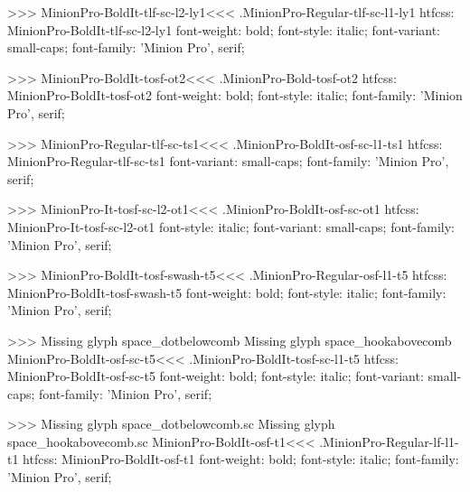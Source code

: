 {>>>
\<MinionPro-BoldIt-tlf-sc-l2-ly1\><<<
.MinionPro-Regular-tlf-sc-l1-ly1
htfcss:  MinionPro-BoldIt-tlf-sc-l2-ly1  font-weight: bold; font-style: italic; font-variant: small-caps; font-family: 'Minion Pro', serif;

>>>
\<MinionPro-BoldIt-tosf-ot2\><<<
.MinionPro-Bold-tosf-ot2
htfcss:  MinionPro-BoldIt-tosf-ot2  font-weight: bold; font-style: italic; font-family: 'Minion Pro', serif;

>>>
\<MinionPro-Regular-tlf-sc-ts1\><<<
.MinionPro-BoldIt-osf-sc-l1-ts1
htfcss:  MinionPro-Regular-tlf-sc-ts1  font-variant: small-caps; font-family: 'Minion Pro', serif;

>>>
\<MinionPro-It-tosf-sc-l2-ot1\><<<
.MinionPro-BoldIt-osf-sc-ot1
htfcss:  MinionPro-It-tosf-sc-l2-ot1  font-style: italic; font-variant: small-caps; font-family: 'Minion Pro', serif;

>>>
\<MinionPro-BoldIt-tosf-swash-t5\><<<
.MinionPro-Regular-osf-l1-t5
htfcss:  MinionPro-BoldIt-tosf-swash-t5  font-weight: bold; font-style: italic; font-family: 'Minion Pro', serif;

>>>
Missing glyph	space_dotbelowcomb
Missing glyph	space_hookabovecomb
\<MinionPro-BoldIt-osf-sc-t5\><<<
.MinionPro-BoldIt-tosf-sc-l1-t5
htfcss:  MinionPro-BoldIt-osf-sc-t5  font-weight: bold; font-style: italic; font-variant: small-caps; font-family: 'Minion Pro', serif;

>>>
Missing glyph	space_dotbelowcomb.sc
Missing glyph	space_hookabovecomb.sc
\<MinionPro-BoldIt-osf-t1\><<<
.MinionPro-Regular-lf-l1-t1
htfcss:  MinionPro-BoldIt-osf-t1  font-weight: bold; font-style: italic; font-family: 'Minion Pro', serif;

}
